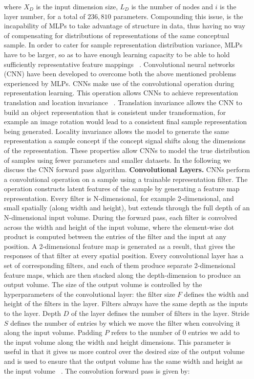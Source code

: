 where $X_D$ is the input dimension size, $L_D$ is the number of nodes and $i$ is the layer number, for a total of $236,810$ parameters. Compounding this issue, is the incapability of MLPs to take advantage of structure in data, thus having no way of compensating for distributions of representations of the same conceptual sample. In order to cater for sample representation distribution variance, MLPs have to be larger, so as to have enough learning capacity to be able to hold sufficiently representative feature mappings ~\citep{lecun1998gradient}. \newline
Convolutional neural networks (CNN) have been developed to overcome both the above mentioned problems experienced by MLPs. CNNs make use of the convolutional operation during representation learning. This operation allows CNNs to achieve representation translation and location invariance ~\citep{simonyan2014very}. Translation invariance allows the CNN to build an object representation that is consistent under transformation, for example an image rotation would lead to a consistent final sample representation being generated. Locality invariance allows the model to generate the same representation a sample concept if the concept signal shifts along the dimensions of the representation. These properties allow CNNs to model the true distribution of samples using fewer parameters and smaller datasets. In the following we discuss the CNN forward pass algorithm. \newline
\textbf{Convolutional Layers.} CNNs perform a convolutional operation on a sample using a trainable representation filter. The operation constructs latent features of the sample by generating a feature map representation. Every filter is N-dimensional, for example 2-dimensional, and small spatially (along width and height), but extends through the full depth of an N-dimensional input volume. During the forward pass, each filter is convolved across the width and height of the input volume, where the element-wise dot product is computed between the entries of the filter and the input at any position. A 2-dimensional feature map is generated as a result, that gives the responses of that filter at every spatial position. Every convolutional layer has a set of corresponding filters, and each of them produce separate 2-dimensional feature maps, which are then stacked along the depth-dimension to produce an output volume. The size of the output volume is controlled by the hyperparameters of the convolutional layer: the filter size $F$ defines the width and height of the filters in the layer. Filters always have the same depth as the inputs to the layer. Depth $D$ of the layer defines the number of filters in the layer. Stride $S$ defines the number of entries by which we move the filter when convolving it along the input volume. Padding $P$ refers to the number of 0 entries we add to the input volume along the width and height dimensions. This parameter is useful in that it gives us more control over the desired size of the output volume and is used to ensure that the output volume has the same width and height as the input volume ~\citep{DLIndaba2017}.\newpage
The convolution forward pass is given by:

